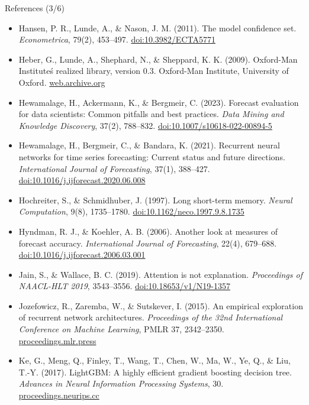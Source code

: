 \begin{frame}{References (3/6)}
\itemsize{\tiny}
\begin{itemize}
    \item Hansen, P. R., Lunde, A., \& Nason, J. M. (2011). The model confidence set. \textit{Econometrica}, 79(2), 453--497. \href{https://doi.org/10.3982/ECTA5771}{doi:10.3982/ECTA5771}
    \item Heber, G., Lunde, A., Shephard, N., \& Sheppard, K. K. (2009). Oxford-Man Institute\'s realized library, version 0.3. Oxford-Man Institute, University of Oxford. \href{https://web.archive.org/web/20220301022212/https://realized.oxford-man.ox.ac.uk/}{web.archive.org}
    \item Hewamalage, H., Ackermann, K., \& Bergmeir, C. (2023). Forecast evaluation for data scientists: Common pitfalls and best practices. \textit{Data Mining and Knowledge Discovery}, 37(2), 788--832. \href{https://doi.org/10.1007/s10618-022-00894-5}{doi:10.1007/s10618-022-00894-5}
    \item Hewamalage, H., Bergmeir, C., \& Bandara, K. (2021). Recurrent neural networks for time series forecasting: Current status and future directions. \textit{International Journal of Forecasting}, 37(1), 388--427. \href{https://doi.org/10.1016/j.ijforecast.2020.06.008}{doi:10.1016/j.ijforecast.2020.06.008}
    \item Hochreiter, S., \& Schmidhuber, J. (1997). Long short-term memory. \textit{Neural Computation}, 9(8), 1735--1780. \href{https://doi.org/10.1162/neco.1997.9.8.1735}{doi:10.1162/neco.1997.9.8.1735}
    \item Hyndman, R. J., \& Koehler, A. B. (2006). Another look at measures of forecast accuracy. \textit{International Journal of Forecasting}, 22(4), 679--688. \href{https://doi.org/10.1016/j.ijforecast.2006.03.001}{doi:10.1016/j.ijforecast.2006.03.001}
    \item Jain, S., \& Wallace, B. C. (2019). Attention is not explanation. \textit{Proceedings of NAACL-HLT 2019}, 3543--3556. \href{https://doi.org/10.18653/v1/N19-1357}{doi:10.18653/v1/N19-1357}
    \item Jozefowicz, R., Zaremba, W., \& Sutskever, I. (2015). An empirical exploration of recurrent network architectures. \textit{Proceedings of the 32nd International Conference on Machine Learning}, PMLR 37, 2342--2350. \href{https://proceedings.mlr.press/v37/jozefowicz15.html}{proceedings.mlr.press}
    \item Ke, G., Meng, Q., Finley, T., Wang, T., Chen, W., Ma, W., Ye, Q., \& Liu, T.-Y. (2017). LightGBM: A highly efficient gradient boosting decision tree. \textit{Advances in Neural Information Processing Systems}, 30. \href{https://proceedings.neurips.cc/paper/2017/hash/6449f44a102fde848669bdd9eb6b76fa-Abstract.html}{proceedings.neurips.cc}

\end{itemize}
\end{frame}
